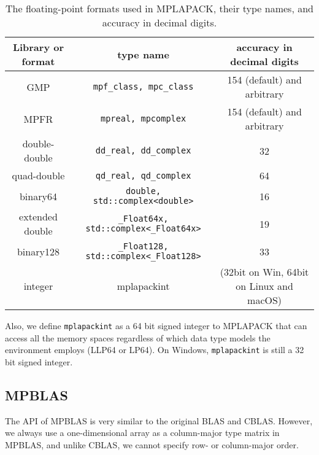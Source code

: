 \documentclass[12pt]{article}
\begin{document}
\begin{table}
\caption{The floating-point formats used in MPLAPACK, their type names, and accuracy in decimal digits.}\label{mplapackformats}
\begin{center}
\begin{tabular}{c|c|c} \hline
Library or format & type name & accuracy in decimal digits \\ \hline
GMP             & {\tt mpf\_class, mpc\_class}       & 154 (default) and arbitrary\\
MPFR            & {\tt mpreal, mpcomplex}            & 154 (default) and arbitrary \\
double-double   & {\tt dd\_real, dd\_complex}        & 32\\
quad-double     & {\tt qd\_real, qd\_complex}        & 64 \\
binary64        & {\tt double, std::complex<double>} & 16 \\
extended double & {\tt \_Float64x, std::complex<\_Float64x>} & 19  \\
binary128       & {\tt \_Float128, std::complex<\_Float128>} & 33 \\ 
integer         & mplapackint & (32bit on Win, 64bit on Linux and macOS) \\ \hline
\end{tabular}
\end{center}
\end{table}
Also, we define {\tt mplapackint} as a 64 bit signed integer to MPLAPACK that can access all the memory spaces regardless
of which data type models the environment employs (LLP64 or LP64). On Windows, {\tt mplapackint} is still a 32 bit signed integer.


\subsection{MPBLAS}
The API of MPBLAS is very similar to the original BLAS and CBLAS. However, we always use a one-dimensional array as a column-major type matrix in MPBLAS, and unlike CBLAS, we cannot specify row- or column-major order. 
\end{document}
